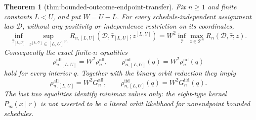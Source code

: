 \documentclass{article}
\newtheorem{theorem}{Theorem}
\begin{document}
\begin{theorem}[thm:bounded-outcome-endpoint-transfer]\label{thm:bounded-outcome-endpoint-transfer}
Fix \(n\geq1\) and finite constants \(L<U\), and put \(W=U-L\).  For every schedule-independent assignment law \(\mathcal D\), without any positivity or independence restriction on its coordinates,
\[
\inf_{\widehat\tau_{[L,U]}}
\sup_{z^{[L,U]}\in[L,U]^{3n}}
R_{n,[L,U]}(\mathcal D,\widehat\tau_{[L,U]};z^{[L,U]})
=W^2\inf_{\widehat\tau}
\max_{z\in\mathcal T^n}R_n(\mathcal D,\widehat\tau;z).
\]
Consequently the exact finite-\(n\) equalities
\[
\rho_{n,[L,U]}^{\mathrm{all}}=W^2\rho_n^{\mathrm{all}},
\qquad
\rho_{n,[L,U]}^{\mathrm{iid}}(q)=W^2\rho_n^{\mathrm{iid}}(q)
\]
hold for every interior \(q\).  Together with the binary orbit reduction they imply
\[
\rho_{n,[L,U]}^{\mathrm{all}}=W^2G_n^{\mathrm{all}},
\qquad
\rho_{n,[L,U]}^{\mathrm{iid}}(q)=W^2G_n^{\mathrm{iid}}(q).
\]
The last two equalities identify minimax values only: the eight-type kernel \(P_m(x\mid r)\) is not asserted to be a literal orbit likelihood for nonendpoint bounded schedules.
\end{theorem}
\end{document}
